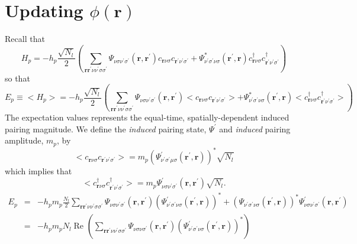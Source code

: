 \section{Updating $\phi(\mathbf{r})$}

Recall that
\begin{equation}
H_{p}  = -h_p\frac{\sqrt{N_l}}{2} 
\left( \sum_{\mathbf{r}\mathbf{r}^{\prime}
\nu\nu^{\prime}\sigma\sigma^{\prime}}  
\Psi_{\nu\sigma\nu^{\prime}\sigma^{\prime}}(\mathbf{r},\mathbf{r}^{\prime})
 c_{\mathbf{r}\nu\sigma}c_{\mathbf{r}^{\prime}\nu^{\prime}\sigma^{\prime}} + 
\Psi_{\nu^{\prime}\sigma^{\prime}\nu\sigma}^*(\mathbf{r}^{\prime},\mathbf{r})
c^{\dagger}_{\mathbf{r}\nu\sigma}
 c^{\dagger}_{\mathbf{r}^{\prime}\nu^{\prime}\sigma^{\prime}}\right)
\end{equation}
so that
\begin{equation}
E_p \equiv <H_p> 
= -h_p\frac{\sqrt{N_l}}{2} 
\left( \sum_{\mathbf{r}\mathbf{r}^{\prime}\nu\nu^{\prime}\sigma\sigma^{\prime}}  
\Psi_{\nu\sigma\nu^{\prime}\sigma^{\prime}}(\mathbf{r},\mathbf{r}^{\prime})
<c_{\mathbf{r}\nu\sigma}c_{\mathbf{r}^{\prime}\nu^{\prime}\sigma^{\prime}}> + 
\Psi_{\nu^{\prime}\sigma^{\prime}\nu\sigma}^*(\mathbf{r}^{\prime},\mathbf{r})
 <c^{\dagger}_{\mathbf{r}\nu\sigma}
 c^{\dagger}_{\mathbf{r}^{\prime}\nu^{\prime}\sigma^{\prime}}>\right)
\end{equation}
The expectation values represents the
equal-time, spatially-dependent
induced pairing magnitude.
We define the \textit{induced} pairing state, $\Psi^{\prime}$
and \textit{induced} pairing amplitude, $m_p $, by
\begin{equation}
<c_{\mathbf{r}\nu\sigma}c_{\mathbf{r}^{\prime}\nu^{\prime}\sigma^{\prime}}>  =  m_p 
\left(\Psi^{\prime}_{\nu^{\prime}\sigma^{\prime}\mu\sigma}(\mathbf{r}^{\prime},
\mathbf{r})\right)^* \sqrt{N_l}
\end{equation}
which implies that
\begin{equation}
<c^{\dagger}_{\mathbf{r}\nu\sigma} 
c^{\dagger}_{\mathbf{r}^{\prime}\nu^{\prime}\sigma^{\prime}}>  = 
m_p \Psi^{\prime}_{\nu\sigma\nu^{\prime}\sigma^{\prime}}(\mathbf{r},\mathbf{r}^{\prime})
\sqrt{N_l}.
\end{equation}
\begin{eqnarray}
E_p & =  & - h_p m_p \frac{N_l}{2} 
\sum_{\mathbf{r}\mathbf{r}^{\prime}\nu\nu^{\prime}\sigma\sigma^{\prime}} 
\Psi_{\nu\sigma\nu^{\prime}\sigma^{\prime}}(\mathbf{r},\mathbf{r}^{\prime}) 
\left(\Psi^{\prime}_{\nu^{\prime}\sigma^{\prime}\nu\sigma}
(\mathbf{r}^{\prime},\mathbf{r})\right)^* +
\left(\Psi_{\nu^{\prime}\sigma^{\prime}\nu\sigma}(\mathbf{r}^{\prime},
\mathbf{r})\right)^* 
\Psi^{\prime}_{\nu\sigma\nu^{\prime}\sigma^{\prime}}(\mathbf{r},\mathbf{r}^{\prime})
\\
& = &
- h_p m_p N_l \;\textrm{Re }
\left(\sum_{\mathbf{r}\mathbf{r}^{\prime}\nu\nu^{\prime}\sigma\sigma^{\prime}} 
\Psi_{\nu\sigma\nu\sigma^{\prime}}(\mathbf{r},\mathbf{r}^{\prime}) 
\left(\Psi^{\prime}_{\nu^{\prime}\sigma^{\prime}\nu\sigma}
(\mathbf{r}^{\prime},\mathbf{r})\right)^* \right)  
\end{eqnarray} 
